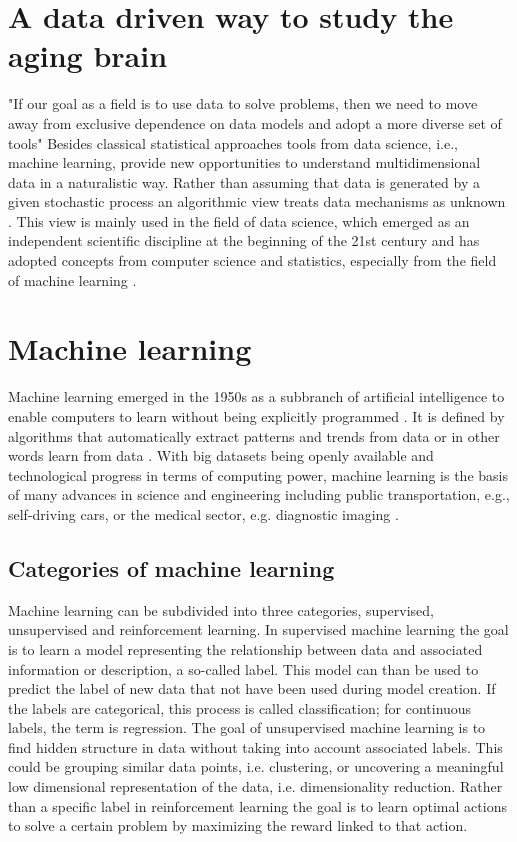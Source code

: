 \section{A data driven way to study the aging brain}
"If our goal as a field is to use data to solve problems, then we need to move away from exclusive dependence on data models and adopt a more diverse set of tools" \cite{Breiman2001}
Besides classical statistical approaches tools from data science, i.e., machine learning, provide new opportunities to understand multidimensional data in a naturalistic way. Rather than assuming that data is generated by a given stochastic process an algorithmic view treats data mechanisms as unknown \cite{Breiman2001}. This view is mainly used in the field of data science, which emerged as an independent scientific discipline at the beginning of the 21st century and has adopted concepts from computer science and statistics, especially from the field of machine learning \cite{Nylen2013}.

\section{Machine learning}
Machine learning emerged in the 1950s as a subbranch of artificial intelligence to enable computers to learn without being explicitly programmed \cite{Samual1959}. It is defined by algorithms that automatically extract patterns and trends from data or in other words learn from data \cite{Hastie2009}. With big datasets being openly available and technological progress in terms of computing power, machine learning is the basis of many advances in science and engineering including public transportation, e.g., self-driving cars, or the medical sector, e.g. diagnostic imaging \cite{Liu2020,Jordan2015}.

\subsection{Categories of machine learning}
Machine learning can be subdivided into three categories, supervised, unsupervised and reinforcement learning. In supervised machine learning the goal is to learn a model representing the relationship between data and associated information or description, a so-called label. This model can than be used to predict the label of new data that not have been used during model creation. If the labels are categorical, this process is called classification; for continuous labels, the term is regression. The goal of unsupervised machine learning is to find hidden structure in data without taking into account associated labels. This could be grouping similar data points, i.e. clustering, or uncovering a meaningful low dimensional representation of the data, i.e. dimensionality reduction. Rather than a specific label in reinforcement learning the goal is to learn optimal actions to solve a certain problem by maximizing the reward linked to that action.

